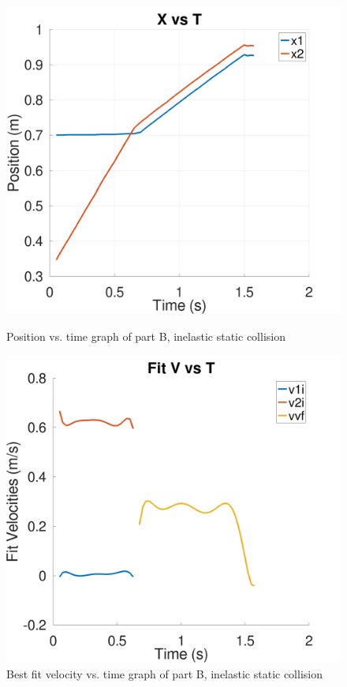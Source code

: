 \documentclass[a4paper, 12pt]{article}
\begin{document}
    \bigskip
    \bigskip
    \begin{figure}[ht]
        \begin{minipage}{0.40\textwidth}
            \centering
            \includegraphics[width=\linewidth]{./inelastic_static_X.png}
            \caption{Position vs. time graph of part B, inelastic static collision}
            \label{fig:inelastic_static_X}
        \end{minipage}
        \hfill
        \begin{minipage}{0.40\textwidth}
            \centering
            \includegraphics[width=\linewidth]{./inelastic_static_Vfit.png}
            \caption{Best fit velocity vs. time graph of part B, inelastic static collision}
            \label{fig:inelastic_static_V}
        \end{minipage}
    \end{figure}
\end{document}
